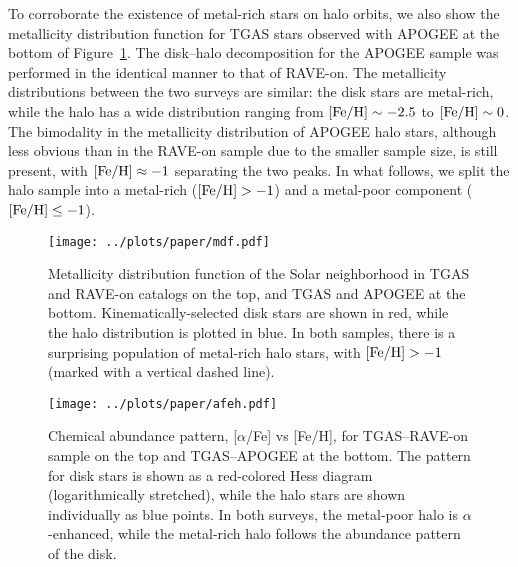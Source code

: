 \documentclass[apj, twocolappendix, numberedappendix, appendixfloats]{emulateapj}
\begin{document}
To corroborate the existence of metal-rich stars on halo orbits, we also show the metallicity distribution function for TGAS stars observed with APOGEE at the bottom of Figure~\ref{fig:mdf}.
The disk--halo decomposition for the APOGEE sample was performed in the identical manner to that of RAVE-on.
The metallicity distributions between the two surveys are similar: the disk stars are metal-rich, while the halo has a wide distribution ranging from $\rm[Fe/H]\sim-2.5$ to $\rm[Fe/H]\sim0$.
The bimodality in the metallicity distribution of APOGEE halo stars, although less obvious than in the RAVE-on sample due to the smaller sample size, is still present, with $\rm[Fe/H]\approx-1$ separating the two peaks.
In what follows, we split the halo sample into a metal-rich ($\rm[Fe/H]>-1$) and a metal-poor component ($\rm[Fe/H]\leq-1$).

\begin{figure}
\begin{center}
\texttt{[image: ../plots/paper/mdf.pdf]}
\caption{Metallicity distribution function of the Solar neighborhood in TGAS and RAVE-on catalogs on the top, and TGAS and APOGEE at the bottom.
Kinematically-selected disk stars are shown in red, while the halo distribution is plotted in blue.
In both samples, there is a surprising population of metal-rich halo stars, with $\rm[Fe/H]>-1$ (marked with a vertical dashed line).}
\label{fig:mdf}
\end{center}
\end{figure}

\begin{figure}
\begin{center}
\texttt{[image: ../plots/paper/afeh.pdf]}
\caption{Chemical abundance pattern, [$\alpha$/Fe] vs [Fe/H], for TGAS--RAVE-on sample on the top and TGAS--APOGEE at the bottom.
The pattern for disk stars is shown as a red-colored Hess diagram (logarithmically stretched), while the halo stars are shown individually as blue points.
In both surveys, the metal-poor halo is $\alpha$-enhanced, while the metal-rich halo follows the abundance pattern of the disk.}
\label{fig:afeh}
\end{center}
\end{figure}
\end{document}
